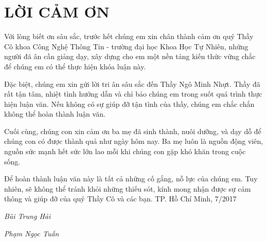 \newpage
\chapter*{LỜI CẢM ƠN}

Với lòng biết ơn sâu sắc, trước hết chúng em xin chân thành cảm ơn quý Thầy Cô khoa Công Nghệ Thông Tin - trường đại học Khoa Học Tự Nhiên, những người đã ân cần giảng dạy, xây dựng cho em một nền tảng kiến thức vững chắc để chúng em có thể thực hiện khóa luận này.

Đặc biệt, chúng em xin gửi lời tri ân sâu sắc đến Thầy Ngô Minh Nhựt. Thầy đã rất tận tâm, nhiệt tình hướng dẫn và chỉ bảo chúng em trong suốt quá trình thực hiện luận văn. Nếu không có sự giúp đỡ tận tình của thầy, chúng em chắc chắn không thể hoàn thành luận văn.

Cuối cùng, chúng con xin cảm ơn ba mẹ đã sinh thành, nuôi dưỡng, và dạy dỗ để chúng con có được thành quả như ngày hôm nay. Ba mẹ luôn là nguồn động viên, nguồn sức mạnh hết sức lớn lao mỗi khi chúng con gặp khó khăn trong cuộc sống.

Để hoàn thành luận văn này là tất cả những cố gắng, nỗ lực của chúng em. Tuy nhiên, sẽ không thể tránh khỏi những thiếu sót, kính mong nhận được sự cảm thông và giúp đỡ của quý Thầy Cô và các bạn.
\hfill TP. Hồ Chí Minh, 7/2017

\hfill \textit{Bùi Trung Hải}

\hfill \textit{Phạm Ngọc Tuấn}
